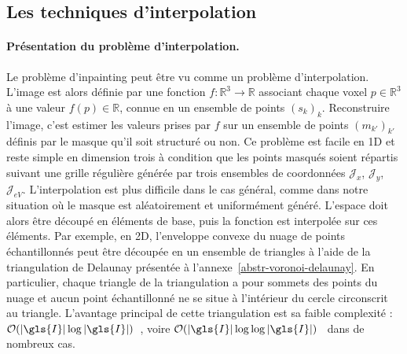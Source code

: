 \subsection{Les techniques d'interpolation}\label{sec-interpolation}

\paragraph{Présentation du problème d'interpolation.} Le problème d'inpainting peut être vu comme un problème d'interpolation. L'image est alors définie par une fonction $f:\mathbb{R}^3\rightarrow \mathbb{R}$ associant chaque voxel $p\in\mathbb{R}^3$ à une valeur $f(p)\in\mathbb{R}$, connue en un ensemble de points $(s_k)_{k}$. Reconstruire l'image, c'est estimer les valeurs prises par $f$ sur un ensemble de points $(m_{k'})_{k'}$ définis par le masque qu'il soit structuré ou non. 
%
Ce problème est facile en 1D et reste simple en dimension trois à condition que les points masqués soient répartis suivant une grille régulière générée par trois ensembles de coordonnées $\mathcal{J}_x$, $\mathcal{J}_y$, $\mathcal{J}_{eV}$. L'interpolation est plus difficile dans le cas général, comme dans notre situation où le masque est aléatoirement et uniformément généré. L'espace doit alors être découpé en éléments de base, puis la fonction est interpolée sur ces éléments. Par exemple, en 2D, l'enveloppe convexe du nuage de points échantillonnés peut être découpée en un ensemble de triangles à l'aide de la triangulation de Delaunay présentée à l'annexe~\ref{abstr-voronoi-delaunay}. En particulier, chaque triangle de la triangulation a pour sommets des points du nuage et aucun point échantillonné ne se situe à l'intérieur du cercle circonscrit au triangle. L'avantage principal de cette triangulation est sa faible complexité : $\mathcal{O}(|\gls{I}|\log |\gls{I}|)$~\cite{lee1980two}, voire $\mathcal{O}(|\gls{I}|\log \log |\gls{I}|)$~\cite{dwyer1987faster} dans de nombreux cas.

